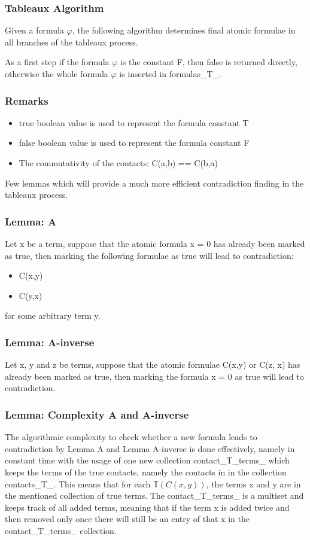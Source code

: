 \documentclass{article}
\begin{document}
		\subsubsection*{Tableaux Algorithm}
			Given a formula $\varphi$, the following algorithm determines final atomic formulae in all branches of the tableaux process.

			As a first step if the formula $\varphi$ is the constant F, then false is returned directly, otherwise the whole formula $\varphi$ is inserted in formulas\_T\_.
		\newline
			\subsubsection*{Remarks}
			\begin{itemize}
				\item true boolean value is used to represent the formula constant T
				\item false boolean value is used to represent the formula constant F
				\item The commutativity of the contacts: C(a,b) == C(b,a)
			\end{itemize}
			Few lemmas which will provide a much more efficient contradiction finding in the tableaux process.
			\subsubsection*{Lemma: A}
				Let x be a term, suppose that the atomic formula x = 0 has already been marked as true,
				then marking the following formulae as true will lead to contradiction:
				\begin{itemize}
					\item C(x,y)
					\item C(y,x)
				\end{itemize}
				for some arbitrary term y.

			\subsubsection*{Lemma: A-inverse}
				Let x, y and z be terms, suppose that the atomic formulae C(x,y) or C(z, x) has already been marked as true,
				then marking the formula x = 0 as true will lead to contradiction.
				
			\subsubsection*{Lemma: Complexity A and A-inverse} 
				The algorithmic complexity to check whether a new formula leads to contradiction by Lemma A and Lemma A-inverse is done
				effectively, namely in constant time with the usage of one new collection contact\_T\_terms\_ which keeps the terms of 
				the true contacts, namely the contacts in in the collection contacts\_T\_. This means that for each $\mathbb{T}(C(x, y))$, the 
				terms x and y are in the mentioned collection of true terms. The contact\_T\_terms\_  is a multiset and keeps track 
				of all added terms, meaning that if the term x is added twice and then removed only once there will still be an entry of 
				that x in the contact\_T\_terms\_ collection.
				
\end{document}
